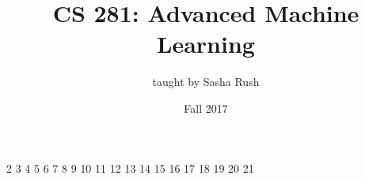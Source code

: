 \documentclass{article}
\begin{document}
\title{CS 281: Advanced Machine Learning}
\date{Fall 2017}
\author{taught by Sasha Rush}
\maketitle

\tableofcontents
\eject

{2}
{3}
{4}
{5}
{6}
{7}
{8}
{9}
{10}
{11}
{12}
{13}
{14}
{15}
{16}
{17}
{18}
{19}
{20}
{21}
\end{document}
